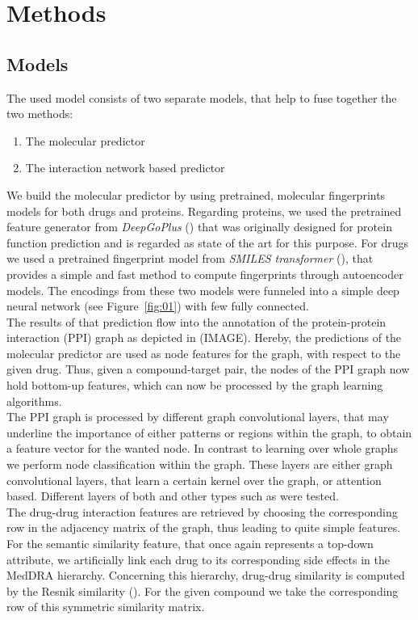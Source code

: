 \documentclass{bioinfo}
\renewcommand{\cite}{\citep}
\begin{document}
\section{Methods}

\subsection{Models}
The used model consists of two separate models, that help to fuse together the two methods:
\begin{enumerate}
	\item The molecular predictor
	\item The interaction network based predictor
\end{enumerate}
We build the molecular predictor by using pretrained, molecular fingerprints models for both drugs and proteins. Regarding proteins, we used the pretrained feature generator from \textit{DeepGoPlus} (\citep{DeepGoPlus}) that was originally designed for protein function prediction and is regarded as state of the art for this purpose. For drugs we used a pretrained fingerprint model from \textit{SMILES transformer} (\cite{SmilesTransformer}), that provides a simple and fast method to compute fingerprints through autoencoder models. The encodings from these two models were funneled into a simple deep neural network (see Figure~\ref{fig:01}) with few fully connected. \\
The results of that prediction flow into the annotation of the protein-protein interaction (PPI) graph as depicted in (IMAGE). Hereby, the predictions of the molecular predictor are used as node features for the graph, with respect to the given drug. Thus, given a compound-target pair, the nodes of the PPI graph now hold bottom-up features, which can now be processed by the graph learning algorithms. \\
The PPI graph is processed by different graph convolutional layers, that may underline the importance of either patterns or regions within the graph, to obtain a feature vector for the wanted node. In contrast to learning over whole graphs we perform node classification within the graph. These layers are either graph convolutional layers, that learn a certain kernel over the graph, or attention based. Different layers of both and other types such as were tested.  \\
The drug-drug interaction features are retrieved by choosing the corresponding row in the adjacency matrix of the graph, thus leading to quite simple features. \\
For the semantic similarity feature, that once again represents a top-down attribute, we artificially link each drug to its corresponding side effects in the MedDRA hierarchy. Concerning this hierarchy, drug-drug similarity is computed by the Resnik similarity (\cite{Resnik1995}). For the given compound we take the corresponding row of this symmetric similarity matrix. \\
\end{document}
